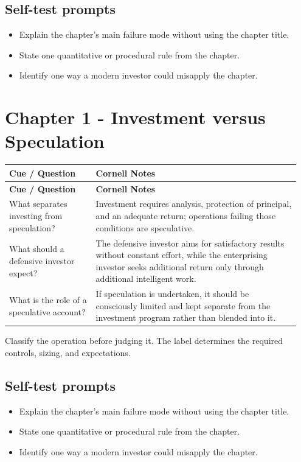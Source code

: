 \documentclass[11pt]{article}
\begin{document}
\subsection*{Self-test prompts}\begin{itemize}\item Explain the chapter's main failure mode without using the chapter title.\item State one quantitative or procedural rule from the chapter.\item Identify one way a modern investor could misapply the chapter.\end{itemize}

\section{Chapter 1 - Investment versus Speculation}
\begin{longtable}{@{}>{\raggedright\arraybackslash}p{0.29\linewidth}>{\raggedright\arraybackslash}p{0.66\linewidth}@{}}\toprule\textbf{Cue / Question} & \textbf{Cornell Notes}\\\midrule\endfirsthead\toprule\textbf{Cue / Question} & \textbf{Cornell Notes}\\\midrule\endhead
What separates investing from speculation? & Investment requires analysis, protection of principal, and an adequate return; operations failing those conditions are speculative. \\
What should a defensive investor expect? & The defensive investor aims for satisfactory results without constant effort, while the enterprising investor seeks additional return only through additional intelligent work. \\
What is the role of a speculative account? & If speculation is undertaken, it should be consciously limited and kept separate from the investment program rather than blended into it. \\
\bottomrule\end{longtable}
\begin{principlebox}Classify the operation before judging it. The label determines the required controls, sizing, and expectations.\end{principlebox}
\subsection*{Self-test prompts}\begin{itemize}\item Explain the chapter's main failure mode without using the chapter title.\item State one quantitative or procedural rule from the chapter.\item Identify one way a modern investor could misapply the chapter.\end{itemize}
\end{document}
